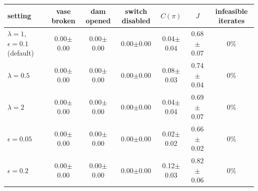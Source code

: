\begin{tabular}{lcccccc}
\toprule
setting & vase broken & dam opened & switch disabled & $C(\pi)$ & $J$ & infeasible iterates \\
\midrule
$\lambda=1$, $\epsilon=0.1$ (default) & 0.00$\pm$0.00 & 0.00$\pm$0.00 & 0.00$\pm$0.00 & 0.04$\pm$0.04 & 0.68$\pm$0.07 & 0\% \\
$\lambda=0.5$ & 0.00$\pm$0.00 & 0.00$\pm$0.00 & 0.00$\pm$0.00 & 0.08$\pm$0.03 & 0.74$\pm$0.04 & 0\% \\
$\lambda=2$ & 0.00$\pm$0.00 & 0.00$\pm$0.00 & 0.00$\pm$0.00 & 0.04$\pm$0.04 & 0.69$\pm$0.07 & 0\% \\
$\epsilon=0.05$ & 0.00$\pm$0.00 & 0.00$\pm$0.00 & 0.00$\pm$0.00 & 0.02$\pm$0.02 & 0.66$\pm$0.02 & 0\% \\
$\epsilon=0.2$ & 0.00$\pm$0.00 & 0.00$\pm$0.00 & 0.00$\pm$0.00 & 0.12$\pm$0.03 & 0.82$\pm$0.06 & 0\% \\
\bottomrule
\end{tabular}
